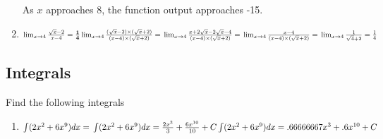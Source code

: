\documentclass{assignment}
\begin{document}
\begin{problem}
\begin{enumerate}
As $x$ approaches 8, the function output approaches -15.\\
    \item $\lim_{x\rightarrow4} \frac{\sqrt{x}-2}{x-4} = \frac{\textbf{1}}{\textbf{4}}\\\\
    \lim_{x\rightarrow4} \frac{(\sqrt{x}-2) \times (\sqrt{x}+2)}{(x-4) \times (\sqrt{x}+2)} = \\\\
    \lim_{x\rightarrow4} \frac{x+2\sqrt{x}-2\sqrt{x}-4}{(x-4) \times (\sqrt{x}+2)} = \\\\
    \lim_{x\rightarrow4} \frac{x-4}{(x-4) \times (\sqrt{x}+2)} = \\\\
    \lim_{x\rightarrow4} \frac{1}{\sqrt{4}+2} = \frac{1}{4}$
\end{enumerate}

\subsection{Integrals}
\noindent Find the following integrals
\begin{enumerate}
    \item $\int (2x^2 + 6x^9) dx =\\\\
    \int (2x^2 + 6x^9) dx = \frac{2x^3}{3} + \frac{6x^{10}}{10} + C \\\\
    \int (2x^2 + 6x^9) dx = .66666667x^3 + .6x^{10} + C$
\end{enumerate}


\end{problem}
\end{document}
